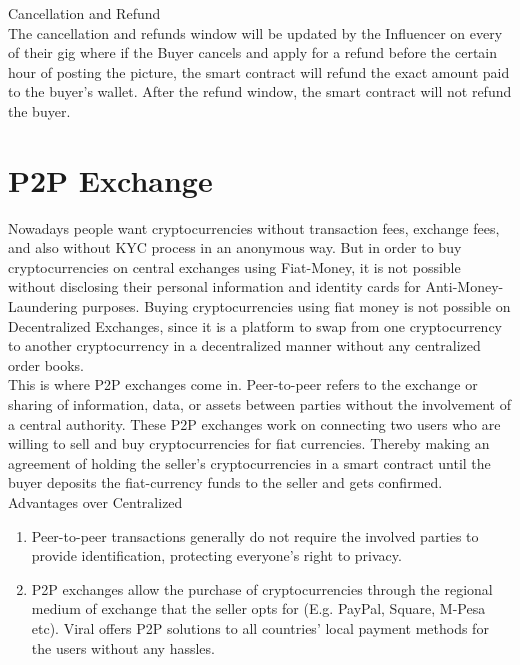 \documentclass[10pt]{article}
\begin{document}
Cancellation and Refund\\


The cancellation and refunds window will be updated by the Influencer on every of their gig where if the Buyer cancels and apply for a refund before the certain hour of posting the picture, the smart contract will refund the exact amount paid to the buyer’s wallet. After the refund window, the smart contract will not refund the buyer. \\


\section{P2P Exchange}

Nowadays people want cryptocurrencies without transaction fees, exchange fees, and also without KYC process in an anonymous way. But in order to buy cryptocurrencies on central exchanges using Fiat-Money, it is not possible without disclosing their personal information and identity cards for Anti-Money-Laundering purposes. Buying cryptocurrencies using fiat money is not possible on Decentralized Exchanges, since it is a platform to swap from one cryptocurrency to another cryptocurrency in a decentralized manner without any centralized order books.\\


This is where P2P exchanges come in. Peer-to-peer refers to the exchange or sharing of information, data, or assets between parties without the involvement of a central authority. These P2P exchanges work on connecting two users who are willing to sell and buy cryptocurrencies for fiat currencies. Thereby making an agreement of holding the seller's cryptocurrencies in a smart contract until the buyer deposits the fiat-currency funds to the seller and gets confirmed.\\


Advantages over Centralized
\begin{enumerate}[leftmargin=+0.2in]
\item Peer-to-peer transactions generally do not require the involved parties to provide identification,  protecting everyone's right to privacy. 
\item P2P exchanges allow the purchase of cryptocurrencies through the regional medium of exchange that the seller opts for (E.g. PayPal, Square, M-Pesa  etc). Viral offers P2P solutions to all countries' local payment methods for the users without any hassles.
\end{enumerate}
\end{document}
